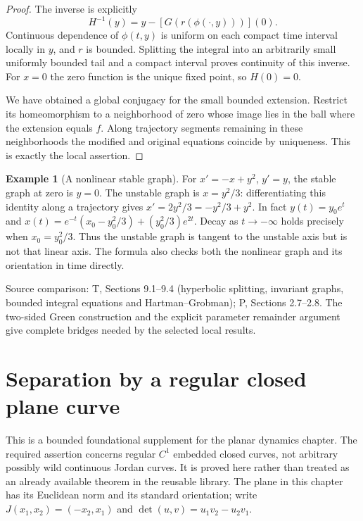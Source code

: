 \documentclass[11pt,oneside]{book}
\theoremstyle{definition}
\newtheorem{example}[theorem]{Example}
\theoremstyle{remark}\newtheorem{remark}[theorem]{Remark}
\newcommand{\source}[1]{\par\begingroup\small\sffamily\color{black!65}Source comparison: #1\par\endgroup}
\begin{document}
\begin{proof}
The inverse is explicitly
\[
 H^{-1}(y)=y-[G(r(\phi(\cdot,y)))](0).
\]
Continuous dependence of $\phi(t,y)$ is uniform on each compact time
interval locally in $y$, and $r$ is bounded. Splitting the integral into
an arbitrarily small uniformly bounded tail and a compact interval proves
continuity of this inverse. For $x=0$ the zero function is the unique fixed
point, so $H(0)=0$.

We have obtained a global conjugacy for the small bounded extension.
Restrict its homeomorphism to a neighborhood of zero whose image lies in
the ball where the extension equals $f$. Along trajectory segments
remaining in these neighborhoods the modified and original equations
coincide by uniqueness. This is exactly the local assertion.
\end{proof}

\begin{example}[A nonlinear stable graph]\label{d13:20:example-graph}
For $x'=-x+y^2$, $y'=y$, the stable graph at zero is $y=0$.
The unstable graph is $x=y^2/3$: differentiating this identity along a
trajectory gives $x'=2y^2/3=-y^2/3+y^2$. In fact
$y(t)=y_0e^t$ and
$x(t)=e^{-t}(x_0-y_0^2/3)+(y_0^2/3)e^{2t}$.
Decay as $t\to-\infty$ holds precisely when $x_0=y_0^2/3$.
Thus the unstable graph is tangent to the unstable axis but is not that
linear axis. The formula also checks both the nonlinear graph and its
orientation in time directly.
\end{example}

\source{T, Sections 9.1--9.4 (hyperbolic splitting, invariant graphs,
bounded integral equations and Hartman--Grobman); P, Sections 2.7--2.8.
The two-sided Green construction and the explicit parameter remainder
argument give complete bridges needed by the selected local results.}



\chapter{Separation by a regular closed plane curve}\label{ch:d13-21}

This is a bounded foundational supplement for the planar dynamics chapter.
The required assertion concerns regular $C^1$ embedded closed curves, not
arbitrary possibly wild continuous Jordan curves. It is proved here rather
than treated as an already available theorem in the reusable library.
The plane in this chapter has its Euclidean norm and its standard orientation;
write $J(x_1,x_2)=(-x_2,x_1)$ and
$\det(u,v)=u_1v_2-u_2v_1$.
\end{document}
